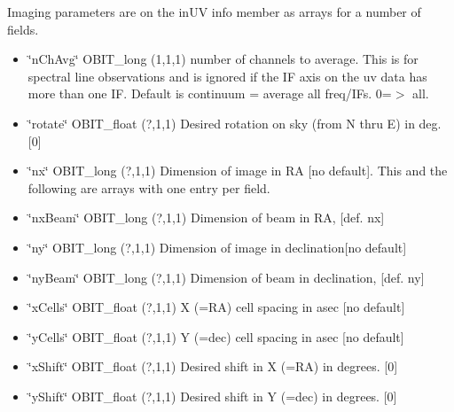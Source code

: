 Imaging parameters are on the in\-UV info member as arrays for a number of fields. \begin{itemize}
\item \char`\"{}n\-Ch\-Avg\char`\"{} OBIT\_\-long (1,1,1) number of channels to average. This is for spectral line observations and is ignored if the IF axis on the uv data has more than one IF. Default is continuum = average all freq/IFs. 0=$>$ all. \item \char`\"{}rotate\char`\"{} OBIT\_\-float (?,1,1) Desired rotation on sky (from N thru E) in deg. [0] \item \char`\"{}nx\char`\"{} OBIT\_\-long (?,1,1) Dimension of image in RA [no default]. This and the following are arrays with one entry per field. \item \char`\"{}nx\-Beam\char`\"{} OBIT\_\-long (?,1,1) Dimension of beam in RA, [def. nx] \item \char`\"{}ny\char`\"{} OBIT\_\-long (?,1,1) Dimension of image in declination[no default] \item \char`\"{}ny\-Beam\char`\"{} OBIT\_\-long (?,1,1) Dimension of beam in declination, [def. ny] \item \char`\"{}x\-Cells\char`\"{} OBIT\_\-float (?,1,1) X (=RA) cell spacing in asec [no default] \item \char`\"{}y\-Cells\char`\"{} OBIT\_\-float (?,1,1) Y (=dec) cell spacing in asec [no default] \item \char`\"{}x\-Shift\char`\"{} OBIT\_\-float (?,1,1) Desired shift in X (=RA) in degrees. [0] \item \char`\"{}y\-Shift\char`\"{} OBIT\_\-float (?,1,1) Desired shift in Y (=dec) in degrees. [0] 
\end{itemize}
